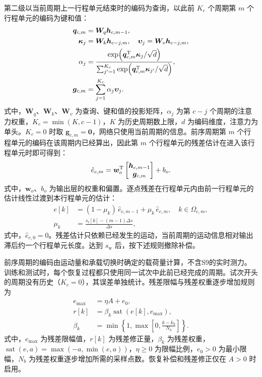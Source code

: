 \documentclass{JQR_LaTeX_Template-0507/JQRnew}
\begin{document}
第二级以当前周期上一行程单元结束时的编码为查询，以此前 $K_c$ 个周期第 $m$ 个行程单元的编码为键和值：
\begin{equation}
\label{eq:cross-cycle}
\begin{aligned}
\bm q_{c,m}&=\bm W_q\bm h_{c,m-1},\\
\bm\kappa_j&=\bm W_k\bm h_{c-j,m},\quad
\bm\upsilon_j=\bm W_v\bm h_{c-j,m},\\
\alpha_j&=\frac{\exp\!\left(\bm q_{c,m}^{\rm T}\bm\kappa_j/\sqrt d\right)}
{\sum_{j'=1}^{K_c}\exp\!\left(\bm q_{c,m}^{\rm T}\bm\kappa_{j'}/\sqrt d\right)},\\
\bm g_{c,m}&=\sum_{j=1}^{K_c}\alpha_j\bm\upsilon_j.
\end{aligned}
\end{equation}
式中，$\bm W_q$、$\bm W_k$、$\bm W_v$ 为查询、键和值的投影矩阵，$\alpha_j$ 为第 $c-j$ 个周期的注意力权重，$K_c=\min(K,c-1)$，$K$ 为历史周期数上限，$d$ 为编码维度，注意力为单头。$K_c=0$ 时取 $\bm g_{c,m}=\bm 0$，网络只使用当前周期的信息。前序周期第 $m$ 个行程单元的编码在该周期内已经算出，因此第 $m$ 个行程单元的残差估计在进入该行程单元时即可得到：
\begin{equation}
\label{eq:cell-output}
\hat e_{c,m}=\bm w_o^{\rm T}
\begin{bmatrix}\bm h_{c,m-1}\\\bm g_{c,m}\end{bmatrix}+b_o .
\end{equation}
式中，$\bm w_o$、$b_o$ 为输出层的权重和偏置。逐点残差在行程单元内由前一行程单元的估计线性过渡到本行程单元的估计：
\begin{equation}
\label{eq:cell-interp}
\begin{aligned}
e[k]&=(1-\mu_k)\,\hat e_{c,m-1}+\mu_k\,\hat e_{c,m},\quad k\in\Omega_{c,m},\\
\mu_k&=\frac{s_{\mathrm r}[k]-(m-1)\Delta s}{\Delta s},
\end{aligned}
\end{equation}
式中，$\hat e_{c,0}=0$。残差估计只依赖已经发生的运动，当前周期的运动信息相对输出滞后约一个行程单元长度。达到 $s_{\mathrm w}$ 后，按下述规则撤除补偿。

前序周期的编码由运动量和承载切换时确定的载荷量计算，不含S9的实时测力。训练和测试时，每个恢复过程都只使用同一试次中此前已经完成的周期。试次开头的周期没有历史（$K_c=0$），其误差单独统计。残差限幅与残差权重逐步增加规则为
\begin{equation}
\label{eq:residual-limit}
\begin{aligned}
e_{\max}&=\eta A+e_0,\\
r[k]&=\beta_k\operatorname{sat}(e[k],e_{\max}),\\
\beta_k&=\min\!\left\{1,\max\!\left[0,\frac{k-k_9}{N_b}\right]\right\}.
\end{aligned}
\end{equation}
式中，$e_{\max}$ 为残差限幅值，$r[k]$ 为残差修正量，$\beta_k$ 为残差权重，$\operatorname{sat}(e,a)=\max(-a,\min(e,a))$，$\eta\ge0$ 为限幅比例，$e_0>0$ 为最小限幅，$N_b$ 为残差权重逐步增加所需的采样点数。恢复补偿和残差修正仅在 $A>0$ 时启用。
\end{document}
